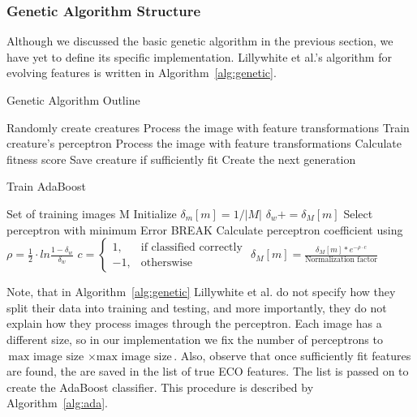 \documentclass[conference]{IEEEtran}
\begin{document}
\subsubsection{Genetic Algorithm Structure}
Although we discussed the basic genetic algorithm in the previous section, we have yet to define its specific implementation. Lillywhite et al.'s algorithm for evolving features is written in Algorithm~\ref{alg:genetic}.
\begin{algorithm}[t]
  \caption{Genetic Algorithm Outline}
  \label{alg:genetic}
  \begin{algorithmic}
    \State Randomly create creatures
    \EndFor
    \State Process the image with feature transformations
    \State Train creature's perceptron
    \EndFor
    \State Process the image with feature transformations
    \EndFor
    \State Calculate fitness score
    \State Save creature if sufficiently fit
    \EndFor
    \State Create the next generation
    \EndFor
  \end{algorithmic}
\end{algorithm}

\begin{algorithm}[t]
  \caption{Train AdaBoost}
  \label{alg:ada}
  \begin{algorithmic}
    \State Set of training images M
    \State Initialize $\delta_m[m]=1/|M|$
    \EndFor
    \State $\delta_w+=\delta_M[m]$
    \EndIf
    \EndFor
    \EndFor
    \State Select perceptron with minimum Error
    \State BREAK
    \EndIf
    \State Calculate perceptron coefficient using
    \State$\rho=\frac{1}{2} \cdot ln\frac{1-\delta_w}{\delta_w}$
    \State
    $c =
    \begin{cases}
      1, & \text{if classified correctly}\\
      -1, & \text{otherswise}
    \end{cases}$
    \State $\delta_M[m]=\frac{\delta_M[m]*e^{-\rho \cdot c}}{\text{Normalization factor}}$
    \EndFor
    \EndFor
  \end{algorithmic}
\end{algorithm}

Note, that in Algorithm~\ref{alg:genetic} Lillywhite et al. do not specify how they split their data into training and testing, and more importantly, they do not explain how they process images through the perceptron. Each image has a different size, so in our implementation we fix the number of perceptrons to $\text{max image size } \times \text{max image size}$. Also, observe that once sufficiently fit features are found, the are saved in the list of true ECO features. The list is passed on to create the AdaBoost classifier. This procedure is described by Algorithm~\ref{alg:ada}.
\end{document}
